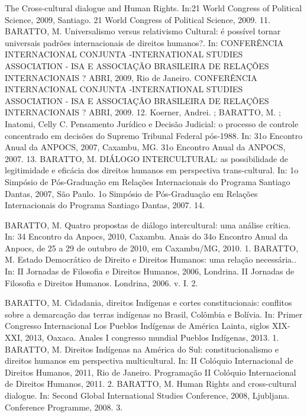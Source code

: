 \begin{cvhonors}
    {The Cross-cultural dialogue and Human Rights. In:21 World Congress of Political Science, 2009, Santiago. 21 World Congress of Political Science, 2009.}
    {}
    {11. }
  \cvhonor
    {BARATTO, M.}
    {Universalismo versus relativismo Cultural: é possível tornar universais padrões internacionais de direitos humanos?. In: CONFERÊNCIA INTERNACIONAL CONJUNTA -INTERNATIONAL STUDIES ASSOCIATION - ISA E ASSOCIAÇÃO BRASILEIRA DE RELAÇÕES INTERNACIONAIS ? ABRI, 2009, Rio de Janeiro. CONFERÊNCIA INTERNACIONAL CONJUNTA -INTERNATIONAL STUDIES ASSOCIATION - ISA E ASSOCIAÇÃO BRASILEIRA DE RELAÇÕES INTERNACIONAIS ? ABRI, 2009.}
    {}
    {12. }
  \cvhonor
    {Koerner, Andrei. ; BARATTO, M. ; Inatomi, Celly C.}
    {Pensamento Jurídico e Decisão Judicial: o processo de controle
    concentrado em decisões do Supremo Tribunal Federal pós-1988. In: 31o Encontro Anual da ANPOCS, 2007, Caxambu,
    MG. 31o Encontro Anual da ANPOCS, 2007.}
    {}
    {13. }
  \cvhonor
    {BARATTO, M.}
    {DIÁLOGO INTERCULTURAL: as possibilidade de legitimidade e eficácia dos direitos humanos em perspectiva trans-cultural. In: 1o Simpósio de Pós-Graduação em Relações Internacionais do Programa Santiago Dantas, 2007, São Paulo. 1o Simpósio de Pós-Graduação em Relações Internacionais do Programa Santiago Dantas, 2007.}
    {}
    {14. }
\end{cvhonors}


\begin{cvhonors}
  \cvhonor
    {BARATTO, M.}
    {Quatro propostas de diálogo intercultural: uma análise crítica. In: 34 Encontro da Anpocs, 2010, Caxambu. Anais do 34o Encontro Anual da Anpocs, de 25 a 29 de outubro de 2010, em Caxambu/MG, 2010.}
    {}
    {1. }
  \cvhonor
    {BARATTO, M.}
  {Estado Democrático de Direito e Direitos Humanos: uma relação necessária.. In: II Jornadas de Filosofia e Direitos Humanos, 2006, Londrina. II Jornadas de Filosofia e Direitos Humanos. Londrina, 2006. v. I.}
    {}
    {2. }
\end{cvhonors}


\begin{cvhonors}
  \cvhonor
    {BARATTO, M.}
    {Cidadania, direitos Indígenas e cortes constitucionais: conflitos sobre a demarcação das terras indígenas no Brasil, Colômbia e Bolívia. In: Primer Congresso Internacional Los Pueblos Indígenas de América Lainta, siglos XIX-XXI, 2013, Oaxaca. Anales I congresso mundial Pueblos Indígenas, 2013.}
    {}
    {1. }
  \cvhonor
    {BARATTO, M.}
    {Direitos Indígenas na América do Sul: constitucionalismo e direitos humanos em perspectiva multicultural. In: II Colóquio Internacional de Direitos Humanos, 2011, Rio de Janeiro. Programação II Colóquio Internacional de Direitos Humanos, 2011.}
    {}
    {2. }
  \cvhonor
    {BARATTO, M.}
    {Human Rights and cross-cultural dialogue. In: Second Global International Studies Conference, 2008, Ljubljana. Conference Programme, 2008.}
    {}
    {3. }
\end{cvhonors}
